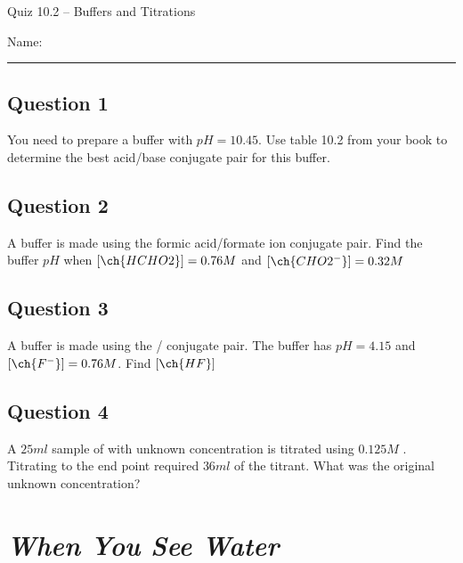 \documentclass[11pt, letterpaper]{memoir}
\begin{document}
	\begin{center}
		{\large Quiz 10.2 -- Buffers and Titrations}
	\end{center}
	{\large Name: \rule[-1mm]{4in}{.1pt} 

\subsection*{Question 1}
You need to prepare a buffer with $pH=10.45$. Use table 10.2 from your book to determine the best acid/base conjugate pair for this buffer.

\vspace{3em}
\subsection*{Question 2}
A buffer is made using the formic acid/formate ion conjugate pair. Find the buffer $pH$ when $\left[\ch{HCHO2}\right]=0.76M$ and $\left[\ch{CHO2^-}\right]=0.32M$

\vspace{9em}
\subsection*{Question 3}
A buffer is made using the / conjugate pair. The buffer has $pH=4.15$ and $\left[\ch{F^-}\right]=0.76M$. Find $\left[\ch{HF}\right]$

\vspace{9em}
\subsection*{Question 4}
A $25ml$ sample of  with unknown concentration is titrated using $0.125M$ . Titrating to the end point required $36ml$ of the  titrant. What was the original unknown concentration?

\newpage
{}
\pagestyle{empty}
\addtocounter{page}{-1}
\section*{\emph{When You See Water}}
}
\end{document}
